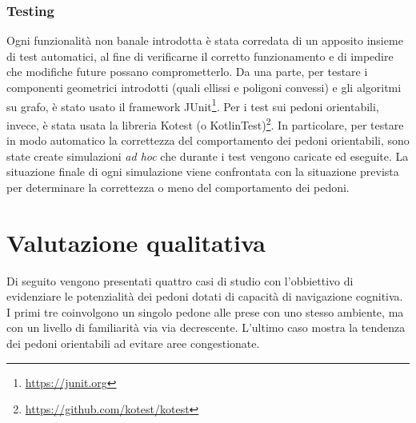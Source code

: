 \documentclass[12pt,a4paper,openright,oneside]{book}
\begin{document}
\subsection{Testing}
Ogni funzionalità non banale introdotta è stata corredata di un apposito insieme di test automatici, al fine di verificarne il corretto funzionamento e di impedire che modifiche future possano comprometterlo. Da una parte, per testare i componenti geometrici introdotti (quali ellissi e poligoni convessi) e gli algoritmi su grafo, è stato usato il framework JUnit\footnote{\url{https://junit.org}}. Per i test sui pedoni orientabili, invece, è stata usata la libreria Kotest (o KotlinTest)\footnote{\url{https://github.com/kotest/kotest}}. In particolare, per testare in modo automatico la correttezza del comportamento dei pedoni orientabili, sono state create simulazioni \emph{ad hoc} che durante i test vengono caricate ed eseguite. La situazione finale di ogni simulazione viene confrontata con la situazione prevista per determinare la correttezza o meno del comportamento dei pedoni.

\chapter{Valutazione qualitativa}
\label{chap:results}
Di seguito vengono presentati quattro casi di studio con l'obbiettivo di evidenziare le potenzialità dei pedoni dotati di capacità di navigazione cognitiva. I primi tre coinvolgono un singolo pedone alle prese con uno stesso ambiente, ma con un livello di familiarità via via decrescente. L'ultimo caso mostra la tendenza dei pedoni orientabili ad evitare aree congestionate.
\end{document}
